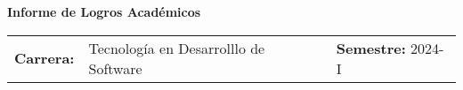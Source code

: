 \def\docente{Velasteguí Izurieta Homero Javier}
\def\escuela{Tecnología en Desarrolllo de Software}
\def\semestre{2024-I}
\def\escenario{Laboratorio}



\def\titulo{\textbf{Informe de Logros Académicos}}

\begin{center}
\Large\titulo\\     
\end{center}

\large
\begin{tabularx}{\textwidth}{ p{20mm} p{8.7cm} p{4cm}}

\textbf{Carrera:} & \escuela & \raggedleft \textbf{Semestre:}  \semestre \\
\end{tabularx}\vspace{10mm}
\renewcommand{\arraystretch}{1.5}
\noindent
